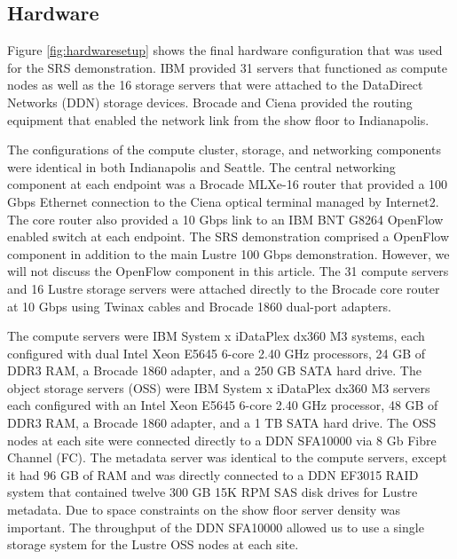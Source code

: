 \documentclass[]{sigplan-proc}
\begin{document}
\subsection{Hardware}\label{sec:hardware}

Figure \ref{fig:hardwaresetup} shows the final hardware configuration that was used for the SRS demonstration. IBM provided 31 servers that functioned as compute nodes as well as the 16 storage servers that
were attached to the DataDirect Networks (DDN) storage devices. Brocade and Ciena provided the routing
equipment that enabled the network link from the show floor to Indianapolis.

The configurations of the compute cluster, storage, and networking components were identical in both
Indianapolis and Seattle. The central networking component at each endpoint was a Brocade MLXe-16 router that
provided a 100 Gbps Ethernet connection to the Ciena optical terminal managed by Internet2. The core router
also provided a 10 Gbps link to an IBM BNT G8264 OpenFlow enabled switch at each endpoint. The SRS
demonstration comprised a OpenFlow component in addition to the main Lustre 100 Gbps demonstration. However,
we will not discuss the OpenFlow component in this article. The 31 compute servers and 16 Lustre storage
servers were attached directly to the Brocade core router at 10 Gbps using Twinax cables and Brocade 1860
dual-port adapters.

The compute servers were IBM System x iDataPlex dx360 M3 systems, each configured with dual Intel Xeon E5645
6-core 2.40 GHz processors, 24 GB of DDR3 RAM, a Brocade 1860 adapter, and a 250 GB SATA hard drive. The
object storage servers (OSS) were IBM System x iDataPlex dx360 M3 servers each configured with an Intel Xeon
E5645 6-core 2.40 GHz processor, 48 GB of DDR3 RAM, a Brocade 1860 adapter, and a 1 TB SATA hard drive. The
OSS nodes at each site were connected directly to a DDN SFA10000 via 8 Gb Fibre Channel (FC). The metadata
server was identical to the compute servers, except it had 96 GB of RAM and was directly connected to a DDN
EF3015 RAID system that contained twelve 300 GB 15K RPM SAS disk drives for Lustre metadata. Due to space
constraints on the show floor server density was important. The throughput of the DDN SFA10000 allowed us to
use a single storage system for the Lustre OSS nodes at each site.
\end{document}
